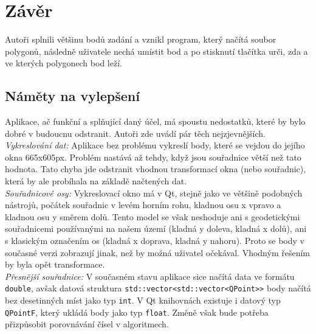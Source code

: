 \documentclass{article}
\begin{document}
\section{Závěr}
\indent Autoři splnili většinu bodů zadání a vznikl program, který načítá soubor polygonů, následně uživatele nechá umístit bod a po stisknutí tlačítka urči, zda a ve kterých polygonech bod leží. 
	\subsection{Náměty na vylepšení} %
	\indent Aplikace, ač funkční a splňující daný účel, má spoustu nedostatků, které by bylo dobré v budoucnu odstranit. Autoři zde uvádí pár těch nejzjevnějších. \\
	\indent \textit{Vykreslování dat:} Aplikace bez problému vykreslí body, které se vejdou do jejího okna 665x605px. Problém nastává až tehdy, když jsou souřadnice větší než tato hodnota. Tato chyba jde odstranit vhodnou transformací okna (nebo souřadnic), která by ale probíhala na základě načtených dat. \\
	\indent \textit{Souřadnicové osy: } Vykreslovací okno má v Qt, stejně jako ve většině podobných nástrojů, počátek souřadnic v levém horním rohu, kladnou osu x vpravo a kladnou osu y směrem dolů. Tento model se však neshoduje ani s geodetickými souřadnicemi používanými na našem území (kladná y doleva, kladná x dolů), ani s klasickým označením os (kladná x doprava, kladná y nahoru). Proto se body v současné verzi zobrazují jinak, než by možná uživatel očekával. Vhodným řešením by byla opět transformace. \\
	\indent \textit{Přesnější souřadnice:} V současném stavu aplikace sice načítá data ve formátu \texttt{double}, avšak datová struktura \texttt{std::vector<std::vector<QPoint>>} body načítá bez desetinných míst jako typ \texttt{int}. V Qt knihovnách existuje i datový typ \texttt{QPointF}, který ukládá body jako typ \texttt{float}. Změně však bude potřeba přizpůsobit porovnávání čísel v algoritmech.


\pagestyle{empty}

\clearpage

\end{document}
